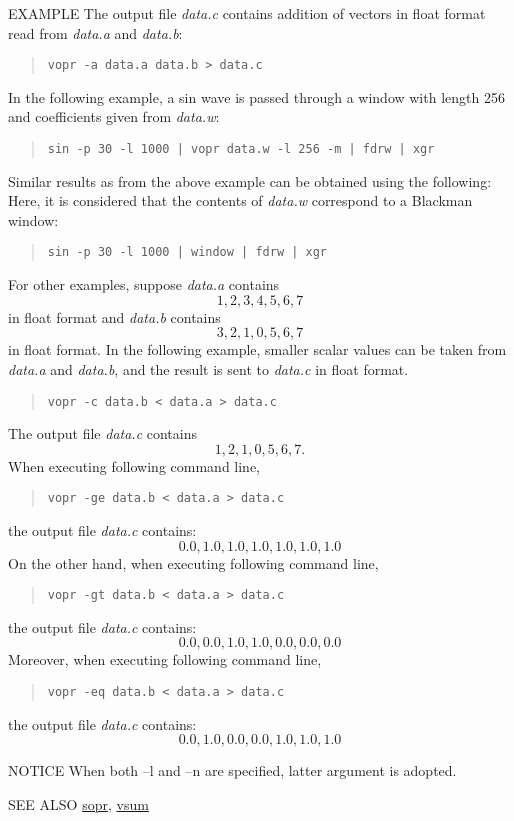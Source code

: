 \begin{qsection}{EXAMPLE}
The output file {\em data.c} contains addition of
vectors in float format read from {\em data.a} and {\em data.b}:
\begin{quote}
  \verb!vopr -a data.a data.b > data.c !
\end{quote}
\par
In the following example, a sin wave is passed through
a window with length 256 and coefficients given from
{\em data.w}:
\begin{quote}
  \verb!sin -p 30 -l 1000 | vopr data.w -l 256 -m | fdrw | xgr!
\end{quote}
Similar results as from the above example can be obtained using the following:
 Here, it is considered that the contents of {\em data.w} correspond to a Blackman window:
\begin{quote}
  \verb!sin -p 30 -l 1000 | window | fdrw | xgr!
\end{quote}
For other examples, suppose {\em data.a} contains
\begin{displaymath}
  1, 2, 3, 4, 5, 6, 7
\end{displaymath}
in float format and {\em data.b} contains
\begin{displaymath}
  3, 2, 1, 0, 5, 6, 7
\end{displaymath}
in float format.
In the following example,
smaller scalar values can be taken from
{\em data.a} and {\em data.b}, and
the result is sent to {\em data.c} in float format.
\begin{quote}
  \verb!vopr -c data.b < data.a > data.c !
\end{quote}
The output file {\em data.c} contains
\begin{displaymath}
  1, 2, 1, 0, 5, 6, 7.
\end{displaymath}
When executing following command line,
\begin{quote}
  \verb!vopr -ge data.b < data.a > data.c !
\end{quote}
the output file {\em data.c} contains:
\begin{displaymath}
  0.0, 1.0, 1.0, 1.0, 1.0, 1.0, 1.0
\end{displaymath}
On the other hand, when executing following command line,
\begin{quote}
  \verb!vopr -gt data.b < data.a > data.c !
\end{quote}
the output file {\em data.c} contains:
\begin{displaymath}
  0.0, 0.0, 1.0, 1.0, 0.0, 0.0, 0.0
\end{displaymath}
Moreover, when executing following command line,
\begin{quote}
  \verb!vopr -eq data.b < data.a > data.c !
\end{quote}
the output file {\em data.c} contains:
\begin{displaymath}
  0.0, 1.0, 0.0, 0.0, 1.0, 1.0, 1.0
\end{displaymath}
\end{qsection}

\begin{qsection}{NOTICE}
When both --l and --n are specified, latter argument is adopted.
\end{qsection}

\begin{qsection}{SEE ALSO}
\hyperlink{sopr}{sopr},
\hyperlink{vsum}{vsum}
\end{qsection}
